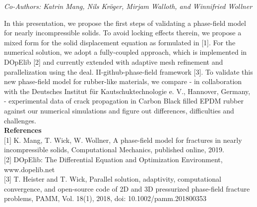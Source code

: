 \begin{center}
\textit{Co-Authors: Katrin Mang, Nils Kröger, Mirjam Walloth, and Winnifried Wollner}
\end{center} 
In this presentation, we propose the first steps of validating a phase-field model for nearly
incompressible solids. To avoid locking effects therein, we propose a mixed form for the solid
displacement equation as formulated in [1]. For the numerical solution, we adopt a fully-coupled
approach, which is implemented in DOpElib [2] and currently extended with adaptive mesh
refinement and parallelization using the deal. II-github-phase-field framework [3]. To validate
this new phase-field model for rubber-like materials, we compare - in collaboration with the
Deutsches Institut für Kautschuktechnologie e. V., Hannover, Germany, - experimental data of
crack propagation in Carbon Black filled EPDM rubber against our numerical simulations and
figure out differences, difficulties and challenges.\\

\noindent\textbf{References}\\
$[$1$]$ K. Mang, T. Wick, W. Wollner, A phase-field model for fractures in nearly incompressible
solids, Computational Mechanics, published online, 2019.\\\newline
$[$2$]$ DOpElib: The Differential Equation and Optimization Environment,\\ www.dopelib.net\\\newline
$[3$] T. Heister and T. Wick, Parallel solution, adaptivity, computational convergence, and open-source code of 2D and 3D pressurized phase-field fracture problems, PAMM, Vol. 18(1),
2018, doi: 10.1002/pamm.201800353
